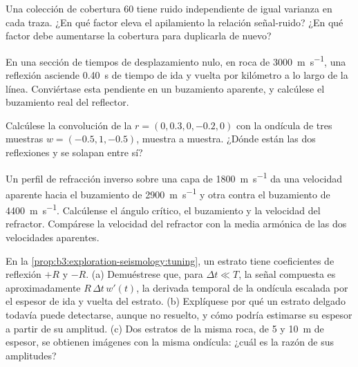 \begin{exercise}[$\star\star$]\label{exo:b3:exploration-seismology:7}
Una colección de cobertura 60 tiene ruido independiente de igual varianza en cada traza. ¿En
qué factor eleva el apilamiento la relación señal-ruido? ¿En qué factor
debe aumentarse la cobertura para duplicarla de nuevo?
\end{exercise}

\begin{exercise}[$\star\star$]\label{exo:b3:exploration-seismology:8}
En una sección de tiempos de desplazamiento nulo, en roca de \qty{3000}{m.s^{-1}}, una reflexión
asciende \qty{0.40}{s} de tiempo de ida y vuelta por kilómetro a lo largo de la línea. Conviértase esta
pendiente en un buzamiento aparente, y calcúlese el buzamiento real del reflector.
\end{exercise}

\begin{exercise}[$\star\star$]\label{exo:b3:exploration-seismology:9}
Calcúlese la convolución de la  $r = (0, 0.3, 0, -0.2, 0)$ con la
ondícula de tres muestras $w = (-0.5, 1, -0.5)$, muestra a muestra. ¿Dónde están las dos
reflexiones y se solapan entre sí?
\end{exercise}

\begin{exercise}[$\star\star\star$]\label{exo:b3:exploration-seismology:10}
Un perfil de refracción inverso sobre una capa de \qty{1800}{m.s^{-1}} da una
velocidad aparente hacia el buzamiento de \qty{2900}{m.s^{-1}} y otra contra el buzamiento de
\qty{4400}{m.s^{-1}}. Calcúlense el ángulo crítico, el buzamiento y la velocidad del
refractor. Compárese la velocidad del refractor con la media armónica de las dos
velocidades aparentes.
\end{exercise}

\begin{exercise}[$\star\star\star$]\label{exo:b3:exploration-seismology:11}
En la \cref{prop:b3:exploration-seismology:tuning}, un estrato tiene coeficientes de reflexión
$+R$ y $-R$. (a) Demuéstrese que, para $\Delta t \ll T$, la señal compuesta
es aproximadamente $R\,\Delta t\,w'(t)$, la derivada temporal de la ondícula
escalada por el espesor de ida y vuelta del estrato. (b) Explíquese por qué un estrato delgado todavía puede
detectarse, aunque no resuelto, y cómo podría estimarse su espesor a partir de
su amplitud. (c) Dos estratos de la misma roca, de 5 y \qty{10}{m} de espesor, se
obtienen imágenes con la misma ondícula: ¿cuál es la razón de sus amplitudes?
\end{exercise}

